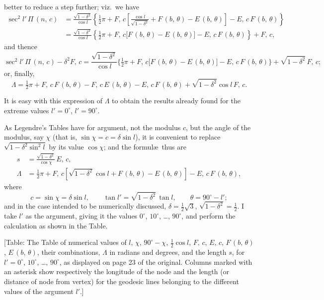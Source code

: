 \documentclass[11pt,a4paper]{article}
\begin{document}
better to reduce a step further; viz.\ we have
\begin{align*}
\sec^2 l'\,\Pi\,(n,\,c)
&= \frac{\sqrt{1 - \delta^2}}{\cos l}
\left\{\tfrac{1}{2}\pi + F,\,c\!\left[\frac{\cos l}{\sqrt{1 - \delta^2}}
+ F\,(b,\,\theta) - E\,(b,\,\theta)\right] - E,\,c\,F\,(b,\,\theta)\right\} \\
&= \frac{\sqrt{1 - \delta^2}}{\cos l}
\left\{\tfrac{1}{2}\pi + F,\,c\bigl[F\,(b,\,\theta) - E\,(b,\,\theta)\bigr]
- E,\,c\,F\,(b,\,\theta)\right\} + F,\,c,
\end{align*}
and thence
\[
\sec^2 l'\,\Pi\,(n,\,c) - \delta^2 F,\,c
= \frac{\sqrt{1 - \delta^2}}{\cos l}
\bigl\{\tfrac{1}{2}\pi + F,\,c\bigl[F\,(b,\,\theta) - E\,(b,\,\theta)\bigr]
- E,\,c\,F\,(b,\,\theta)\bigr\} + \sqrt{1 - \delta^2}\,F,\,c;
\]
or, finally,
\[
\Lambda = \tfrac{1}{2}\pi + F,\,c\,F\,(b,\,\theta)
- F,\,c\,E\,(b,\,\theta) - E,\,c\,F\,(b,\,\theta)
+ \sqrt{1 - \delta^2}\cos l\,F,\,c.
\]

It is easy with this expression of $\Lambda$ to obtain the results already
found for the extreme values $l' = 0^\circ$, $l' = 90^\circ$.

As Legendre's Tables have for argument, not the modulus $c$, but the angle of
the modulus, say $\chi$ (that is, $\sin\chi = c = \delta\sin l$), it is
convenient to replace $\sqrt{1 - \delta^2\sin^2 l}$ by its value $\cos\chi$;
and the formul\ae\ thus are
\begin{align*}
s       &= \frac{\sqrt{1 - \delta^2}}{\cos\chi}\,E,\,c, \\
\Lambda &= \tfrac{1}{2}\pi + F,\,c\!\left[\sqrt{1 - \delta^2}\cos l
+ F\,(b,\,\theta) - E\,(b,\,\theta)\right] - E,\,c\,F\,(b,\,\theta),
\end{align*}
where
\[
c = \sin\chi = \delta\sin l, \qquad
\tan l' = \sqrt{1 - \delta^2}\,\tan l, \qquad
\theta = 90^\circ - l';
\]
and in the case intended to be numerically discussed,
$\delta = \tfrac{1}{2}\sqrt{3}$, $\sqrt{1 - \delta^2} = \tfrac{1}{2}$.  I take
$l'$ as the argument, giving it the values $0^\circ$, $10^\circ$, \dots,
$90^\circ$, and perform the calculation as shown in the Table.

\medskip

[Table:  The Table of numerical values of $l$, $\chi$, $90^\circ - \chi$,
$\tfrac{1}{2}\cos l$, $F,\,c$, $E,\,c$, $F\,(b,\,\theta)$, $E\,(b,\,\theta)$,
their combinations, $\Lambda$ in radians and degrees, and the length $s$, for
$l' = 0^\circ$, $10^\circ$, \dots, $90^\circ$, as displayed on page 23 of the
original.  Columns marked with an asterisk show respectively the longitude of
the node and the length (or distance of node from vertex) for the geodesic
lines belonging to the different values of the argument $l'$.]
\end{document}
